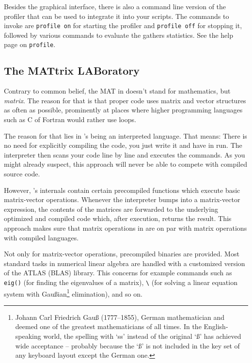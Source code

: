 \begin{remark}
Besides the graphical interface, there is also a command line version of the profiler that can be used to integrate it into your scripts. The commands to invoke are \lstinline!profile on! for starting the profiler and \lstinline!profile off! for stopping it, followed by various commands to evaluate the gathers statistics. See the \matlab{} help page on \lstinline!profile!.
\end{remark}


\subsection{The MATtrix LABoratory}

Contrary to common belief, the MAT in \matlab{} doesn't stand for mathematics, but \emph{matrix}. The reason for that is that proper \matlab{} code uses matrix and vector structures as often as possible, prominently at places where higher programming languages such as C of Fortran would rather use loops.

The reason for that lies in \matlab{}'s being an interpreted language. That means: There is no need for explicitly compiling the code, you just write it and have in run. The \matlab{} interpreter then scans your code line by line and executes the commands. As you might already suspect, this approach will never be able to compete with compiled source code.

However, \matlab{}'s internals contain certain precompiled functions which execute basic matrix-vector operations. Whenever the \matlab{} interpreter bumps into a matrix-vector expression, the contents of the matrices are forwarded to the underlying optimized and compiled code which, after execution, returns the result. This approach makes sure that matrix operations in \matlab{} are on par with matrix operations with compiled languages.

\begin{remark}
Not only for matrix-vector operations, precompiled binaries are provided. Most standard tasks in numerical linear algebra are handled with a customized version of the ATLAS (BLAS) library. This concerns for example commands such as \lstinline!eig()! (for finding the eigenvalues of a matrix), \lstinline!\! (for solving a linear equation system with Gau{\ss}ian\footnote{Johann Carl Friedrich Gau{\ss} (1777--1855), German mathematician and deemed one of the greatest mathematicians of all times. In the English-speaking world, the spelling with `ss' instead of the original `\ss' has achieved wide acceptance -- probably because the `\ss' is not included in the key set of any keyboard layout except the German one.} elimination), and so on.
\end{remark}

